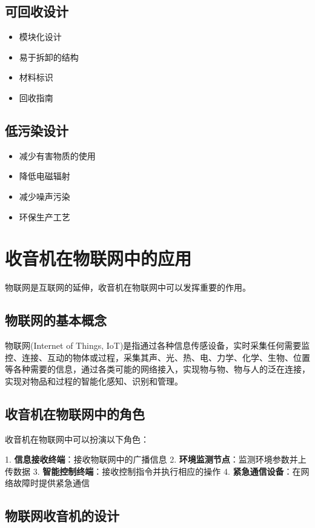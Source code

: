 \documentclass[12pt,UTF8]{ctexbook}
\begin{document}
\section{可回收设计}\begin{itemize}
  \item 模块化设计
  \item 易于拆卸的结构
  \item 材料标识
  \item 回收指南\end{itemize}

\section{低污染设计}\begin{itemize}
  \item 减少有害物质的使用
  \item 降低电磁辐射
  \item 减少噪声污染
  \item 环保生产工艺\end{itemize}

\chapter{收音机在物联网中的应用}

物联网是互联网的延伸，收音机在物联网中可以发挥重要的作用。

\section{物联网的基本概念}

物联网(Internet of Things, IoT)是指通过各种信息传感设备，实时采集任何需要监控、连接、互动的物体或过程，采集其声、光、热、电、力学、化学、生物、位置等各种需要的信息，通过各类可能的网络接入，实现物与物、物与人的泛在连接，实现对物品和过程的智能化感知、识别和管理。

\section{收音机在物联网中的角色}

收音机在物联网中可以扮演以下角色：

1. \textbf{信息接收终端}：接收物联网中的广播信息
2. \textbf{环境监测节点}：监测环境参数并上传数据
3. \textbf{智能控制终端}：接收控制指令并执行相应的操作
4. \textbf{紧急通信设备}：在网络故障时提供紧急通信

\section{物联网收音机的设计}
\end{document}
